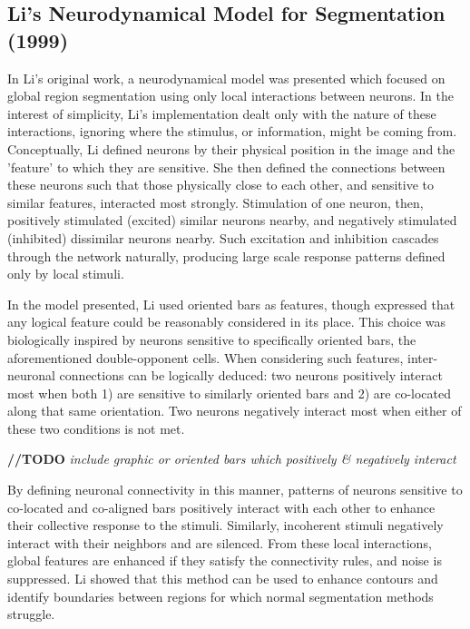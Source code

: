 \documentclass[journal,onecolumn]{IEEEtran}
\begin{document}
\subsection*{Li's Neurodynamical Model for Segmentation (1999)}
In Li's original work, a neurodynamical model was presented which focused on global region segmentation using only local interactions between neurons. In the interest of simplicity, Li's implementation dealt only with the nature of these interactions, ignoring where the stimulus, or information, might be coming from. Conceptually, Li defined neurons by their physical position in the image and the 'feature' to which they are sensitive. She then defined the connections between these neurons such that those physically close to each other, and sensitive to similar features, interacted most strongly. Stimulation of one neuron, then, positively stimulated (excited) similar neurons nearby, and negatively stimulated (inhibited) dissimilar neurons nearby. Such excitation and inhibition cascades through the network naturally, producing large scale response patterns defined only by local stimuli.

In the model presented, Li used oriented bars as features, though expressed that any logical feature could be reasonably considered in its place. This choice was biologically inspired by neurons sensitive to specifically oriented bars, the aforementioned double-opponent cells. When considering such features, inter-neuronal connections can be logically deduced: two neurons positively interact most when both 1) are sensitive to similarly oriented bars and 2) are co-located along that same orientation. Two neurons negatively interact most when either of these two conditions is not met.

\bigskip

\textbf{//TODO} \textit{include graphic or oriented bars which positively \& negatively interact}

\bigskip

By defining neuronal connectivity in this manner, patterns of neurons sensitive to co-located and co-aligned bars positively interact with each other to enhance their collective response to the stimuli. Similarly, incoherent stimuli negatively interact with their neighbors and are silenced. From these local interactions, global features are enhanced if they satisfy the connectivity rules, and noise is suppressed. Li showed that this method can be used to enhance contours and identify boundaries between regions for which normal segmentation methods struggle.
\end{document}
